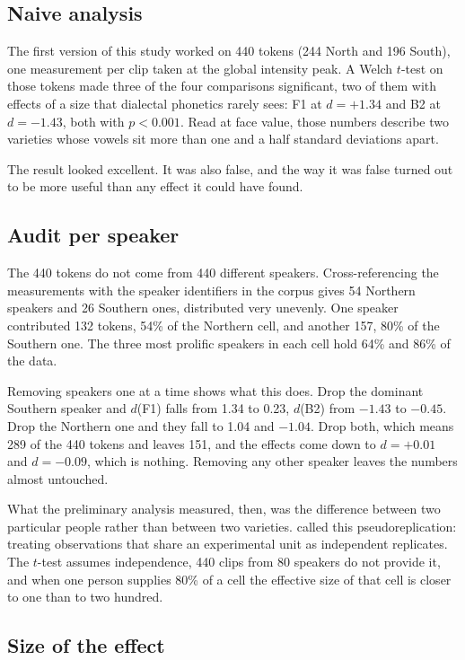 \documentclass[11pt]{article}
\begin{document}
\subsection{Naive analysis}

The first version of this study worked on 440 tokens (244 North and 196 South),
one measurement per clip taken at the global intensity peak. A Welch $t$-test on
those tokens made three of the four comparisons significant, two of them with
effects of a size that dialectal phonetics rarely sees: F1 at $d = +1.34$ and B2
at $d = -1.43$, both with $p < 0.001$. Read at face value, those numbers describe
two varieties whose vowels sit more than one and a half standard deviations
apart.

The result looked excellent. It was also false, and the way it was false turned
out to be more useful than any effect it could have found.

\subsection{Audit per speaker}

The 440 tokens do not come from 440 different speakers. Cross-referencing the
measurements with the speaker identifiers in the corpus gives 54 Northern
speakers and 26 Southern ones, distributed very unevenly. One speaker contributed
132 tokens, 54\% of the Northern cell, and another 157, 80\% of the Southern one.
The three most prolific speakers in each cell hold 64\% and 86\% of the data.

Removing speakers one at a time shows what this does. Drop the dominant Southern
speaker and $d$(F1) falls from 1.34 to 0.23, $d$(B2) from $-1.43$ to $-0.45$.
Drop the Northern one and they fall to 1.04 and $-1.04$. Drop both, which means
289 of the 440 tokens and leaves 151, and the effects come down to $d = +0.01$
and $d = -0.09$, which is nothing. Removing any other speaker leaves the numbers
almost untouched.

What the preliminary analysis measured, then, was the difference between two
particular people rather than between two varieties. \citet{hurlbert1984} called
this pseudoreplication: treating observations that share an experimental unit as
independent replicates. The $t$-test assumes independence, 440 clips from 80
speakers do not provide it, and when one person supplies 80\% of a cell the
effective size of that cell is closer to one than to two hundred.

\subsection{Size of the effect}
\end{document}
